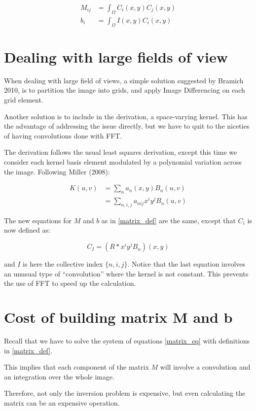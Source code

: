 \begin{align}
M_{ij}  &=   \int_{\Omega}  C_{i}(x,y)  C_{j}(x,y) \\
b_{i} &=  \int_{\Omega} I(x,y) C_{i}(x,y) 
\end{align}

\section{Dealing with large fields of view}

When dealing with large field of views, a simple solution suggested by Bramich 2010, is to partition the image into grids, and apply Image Differencing on each grid element.

Another solution is to include in the derivation, a space-varying kernel.
This has the advantage of addressing the issue directly, but we have to quit to the niceties of having convolutions done with FFT.

The derivation follows the usual least squares derivation, except this time we consider each kernel basis element modulated by a polynomial variation across the image. Following Miller (2008):

\begin{align}
K(u, v) &= \sum_n a_n(x,y) B_n(u, v) \\
&= \sum_{n,i,j} a_{nij} x^i y^j B_n(u, v)
\end{align}

The new equations for $M$ and $b$ as in \ref{matrix_def} are the same, except that $C_{i}$ is now defined as:

\begin{equation}
C_I = \left( R \mathbin{*} x^i y^j B_n \right) (x,y)
\end{equation}

and $I$ is here the collective index $\{n,i,j\}$.
Notice that the last equation involves an unusual type of ``convolution'' where the kernel is not constant. This prevents the use of FFT to speed up the calculation.

\section{Cost of building matrix M and b}

Recall that we have to solve the system of equations \eqref{matrix_eq} with definitions in \eqref{matrix_def}.

This implies that each component of the matrix $M$ will involve a convolution and an integration over the whole image.

Therefore, not only the inversion problem is expensive, but even calculating the matrix can be an expensive operation.

